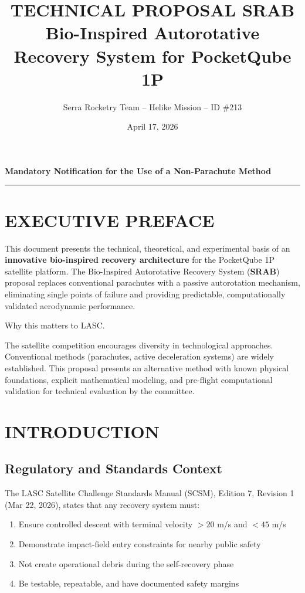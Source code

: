 \documentclass[12pt,a4paper]{article}
\title{TECHNICAL PROPOSAL SRAB\\
\large Bio-Inspired Autorotative Recovery System for PocketQube 1P}
\author{Serra Rocketry Team -- Helike Mission -- ID \#213}
\date{April 17, 2026}
\begin{document}
\maketitle

\begin{center}
\textbf{Mandatory Notification for the Use of a Non-Parachute Method}
\end{center}

\hrule
\vspace{0.5em}

\section*{EXECUTIVE PREFACE}

This document presents the technical, theoretical, and experimental basis of an \textbf{innovative bio-inspired recovery architecture} for the PocketQube 1P satellite platform. The Bio-Inspired Autorotative Recovery System (\textbf{SRAB}) proposal replaces conventional parachutes with a passive autorotation mechanism, eliminating single points of failure and providing predictable, computationally validated aerodynamic performance.

Why this matters to LASC.

The satellite competition encourages diversity in technological approaches. Conventional methods (parachutes, active deceleration systems) are widely established. This proposal presents an alternative method with known physical foundations, explicit mathematical modeling, and pre-flight computational validation for technical evaluation by the committee.

\vspace{0.5em}

\section{INTRODUCTION}
\label{sec:introduction}

\subsection{Regulatory and Standards Context}

The LASC Satellite Challenge Standards Manual (SCSM), Edition 7, Revision 1 (Mar 22, 2026), states that any recovery system must:

\begin{enumerate}[label=\arabic*.]
    \item Ensure controlled descent with terminal velocity $> 20$ m/s and $< 45$ m/s
    \item Demonstrate impact-field entry constraints for nearby public safety
    \item Not create operational debris during the self-recovery phase
    \item Be testable, repeatable, and have documented safety margins
\end{enumerate}
\end{document}
